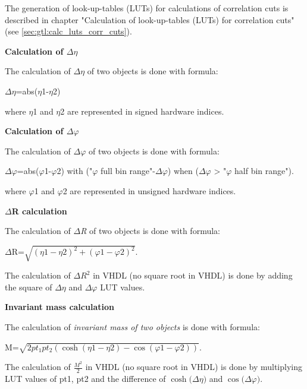 The generation of look-up-tables (LUTs) for calculations of correlation cuts is described in chapter "Calculation of look-up-tables (LUTs) for correlation cuts" (see \ref{sec:gtl:calc_luts_corr_cuts}).

\textbf{Calculation of $\Delta\eta$}
\label{sec:gtl:calculation_delta_eta}

The calculation of \textit{$\Delta\eta$} of two objects is done with formula:

$\Delta\eta$=abs($\eta$1-$\eta$2)

where $\eta$1 and $\eta$2 are represented in signed hardware indices.


\textbf{Calculation of $\Delta\varphi$}
\label{sec:gtl:calculation_delta_phi}

The calculation of \textit{$\Delta\varphi$} of two objects is done with formula:

$\Delta\varphi$=abs($\varphi$1-$\varphi$2) with ("$\varphi$ full bin range"-$\Delta\varphi$) when ($\Delta\varphi$ > "$\varphi$ half bin range").

where $\varphi$1 and $\varphi$2 are represented in unsigned hardware indices.

\textbf{$\Delta$R calculation}
\label{sec:gtl:delta_r_calculation}

The calculation of \textit{$\Delta$R} of two objects is done with formula:

$\Delta$R=$\sqrt{(\eta1-\eta2)^2+(\varphi1-\varphi2)^2}$.

The calculation of $\Delta$$R^2$ in VHDL (no square root in VHDL) is done by adding the square of $\Delta\eta$ and $\Delta\varphi$ LUT values.

\textbf{Invariant mass calculation}
\label{sec:gtl:inv_mass_calculation}

The calculation of \textit{invariant mass of two objects} is done with formula:

M=$\sqrt{2 pt_1  pt_2 (\cosh(\eta1-\eta2)-\cos(\varphi1-\varphi2))}$.

The calculation of $\frac{M^2}{2}$ in VHDL (no square root in VHDL) is done by multiplying LUT values of pt1, pt2 and the difference of $\cosh($$\Delta\eta$$)$ and $\cos($$\Delta\varphi$$)$.


